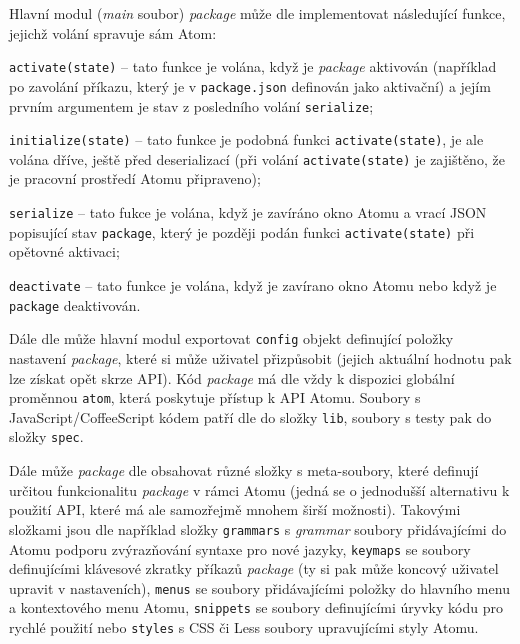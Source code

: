 Hlavní modul (\textit{main} soubor) \textit{package} může dle \cite{atom-docs} implementovat následující funkce, jejichž
volání spravuje sám Atom:
\begin{itemize}
    \begin{sloppypar}
    \item \texttt{activate(state)} – tato funkce je volána, když je \textit{package} aktivován (například po
        zavolání příkazu, který je v \texttt{package.json} definován jako aktivační) a jejím prvním argumentem
        je stav z posledního volání \texttt{serialize};
    \end{sloppypar}
    \item \texttt{initialize(state)} – tato funkce je podobná funkci \texttt{activate(state)}, je ale
        volána dříve, ještě před deserializací (při volání \texttt{activate(state)} je zajištěno, že je
        pracovní prostředí Atomu připraveno);
    \begin{sloppypar}
    \item \texttt{serialize} – tato fukce je volána, když je zavíráno okno Atomu a vrací JSON popisující stav
        \texttt{package}, který je později podán funkci \texttt{activate(state)} při opětovné
        aktivaci;
    \end{sloppypar}
    \item \texttt{deactivate} – tato funkce je volána, když je zavírano okno Atomu nebo když je
        \texttt{package} deaktivován.
\end{itemize}
Dále dle \cite{atom-docs} může hlavní modul exportovat \texttt{config} objekt definující položky nastavení
\textit{package}, které si může uživatel přizpůsobit (jejich aktuální hodnotu pak lze získat opět skrze API). Kód
\textit{package} má dle \cite{atom-docs} vždy k dispozici globální proměnnou \texttt{atom}, která poskytuje
přístup k API Atomu. Soubory s JavaScript/CoffeeScript kódem patří dle \cite{atom-docs} do složky \texttt
{lib}, soubory s testy pak do složky \texttt{spec}.

Dále může \textit{package} dle \cite{atom-docs} obsahovat různé složky s meta-soubory, které definují určitou
funkcionalitu \textit{package} v rámci Atomu (jedná se o jednodušší alternativu k použití API, které má ale samozřejmě
mnohem širší možnosti). Takovými složkami jsou dle \cite{atom-docs} například složky \texttt{grammars} s
\textit{grammar} soubory přidávajícími do Atomu podporu zvýrazňování syntaxe pro nové jazyky, \texttt{keymaps}
se soubory definujícími klávesové zkratky příkazů \textit{package} (ty si pak může koncový uživatel upravit v
nastaveních), \texttt{menus} se soubory přidávajícími položky do hlavního menu a kontextového menu Atomu,
\texttt{snippets} se soubory definujícími úryvky kódu pro rychlé použití nebo \texttt{styles} s CSS
či Less soubory upravujícími styly Atomu.

